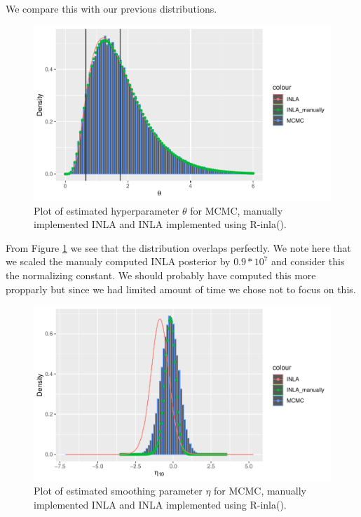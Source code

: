 We compare this with our previous distributions.
\begin{figure}[h]
    \centering
    \includegraphics{Images/theta_comparison.pdf}
    \caption{Plot of estimated hyperparameter $\theta$ for MCMC, manually implemented INLA and INLA implemented using R-inla().}
    \label{fig:theta_comparison}
\end{figure}

From Figure \ref{fig:theta_comparison} we see that the distribution overlaps perfectly. We note here that we scaled the manualy computed INLA posterior by $0.9*10^7$ and consider this the normalizing constant. We should probably have computed this more propparly but since we had limited amount of time we chose not to focus on this. 

\begin{figure}[h]
    \centering
    \includegraphics{Images/smoothing_comparison.pdf}
    \caption{Plot of estimated smoothing parameter $\eta$ for MCMC, manually implemented INLA and INLA implemented using R-inla().}
    \label{fig:smoothing_comparison}
\end{figure}


